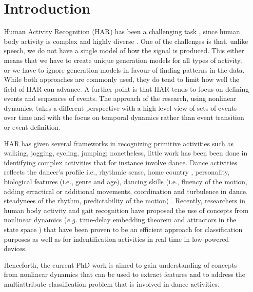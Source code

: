 \documentclass{sigchi}
\begin{document}
\section{Introduction}
Human Activity Recognition (HAR) has been a challenging task \cite{Aggarwal2004}, 
since human body activity is complex and highly diverse \cite{Kim2010}.
One of the challenges is that, unlike speech, we do not have a single model 
of how the signal is produced.  
This either means that we have to create unique generation models for all types 
of activity, or we have to ignore generation models in favour of 
finding patterns in the data.  While both approaches are commonly used, 
they do tend to limit how well the field of HAR can advance. 
A further point is that HAR tends to focus on defining events and sequences of events.
The approach of the research, using nonlinear dynamics, takes a different 
perspective with a high level view of sets of events over time and with 
the focus on temporal 
dynamics rather than event transition or event definition. 


HAR has given several frameworks in recognizing primitive activities 
such as walking, jogging, cycling, jumping; nonetheless, little work has been been
done in identifying complex activities that for instance involve dance. 
Dance activities reflects the dancer's profile i.e., rhythmic sense, 
home country \cite{Iwai2011}, personality, biological features (i.e., genre and age),
dancing skills (i.e., fluency of the motion, adding erractical or additional movements,
coordination and turbulence in dance, steadynees of the rhythm, predictability of 
the motion) \cite{GrammerK.ElisabethOberzaucher2011}.
Recently, researchers in human body activity and gait recognition have proposed
the use of concepts from nonlinear dynamics (\textit{e.g.}
time-delay embedding theorem \cite{J.FrankS.Mannor2010,Sama2013}
and attractors in the state space \cite{Akiduki2013,Akiduki2014}) 
that have been proven to be an efficient approach 
for classification purposes as well as for indentification activities 
in real time in low-powered devices. 

Henceforth, the current PhD work is aimed to gain understanding of 
concepts from nonlinear dynamics that can be used to extract features and
to address the multiattribute classification problem that is involved 
in dance activities.
\end{document}
